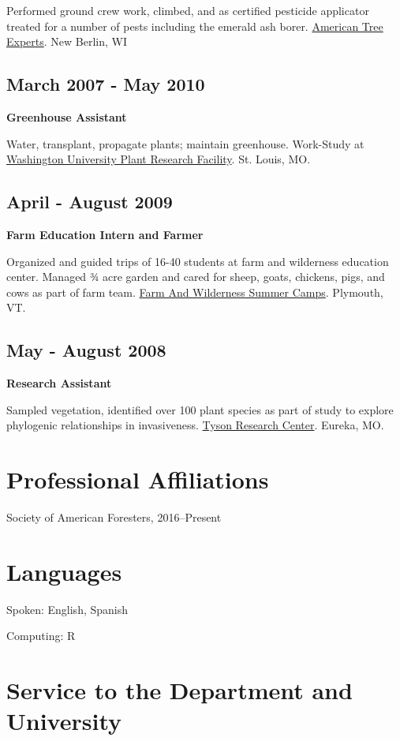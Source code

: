 \documentclass[11pt, sans]{moderncv}
\begin{document}
Performed ground crew work, climbed, and as certified pesticide
applicator treated for a number of pests including the emerald ash
borer. \href{http://atetreecare.com/}{American Tree Experts}.  New Berlin, WI

\subsection*{March 2007 - May 2010}
\label{sec:org07abbd5}
\textbf{Greenhouse Assistant}

Water, transplant, propagate plants; maintain greenhouse. Work-Study
at \href{http://biology4.wustl.edu/greenhouse/index.html}{Washington University Plant Research Facility}. St. Louis, MO.

\subsection*{April - August 2009}
\label{sec:orgff1e200}
\textbf{Farm Education Intern and Farmer}

Organized and guided trips of 16-40 students at farm and wilderness
education center. Managed 3⁄4 acre garden and cared for sheep, goats,
chickens, pigs, and cows as part of farm team.  \href{https://farmandwilderness.org/}{Farm And Wilderness
Summer Camps}. Plymouth, VT.

\subsection*{May - August 2008}
\label{sec:org016186d}
\textbf{Research Assistant}

Sampled vegetation, identified over 100 plant species as part of study
to explore phylogenic relationships in invasiveness.  \href{https://tyson.wustl.edu/2008}{Tyson Research
Center}. Eureka, MO.
\section*{Professional Affiliations}
\label{sec:orga776f93}
Society of American Foresters, 2016--Present

\section*{Languages}
\label{sec:org67e6d84}
Spoken: English, Spanish

Computing: R

\section*{Service to the Department and University}
\label{sec:orgeb2f6ad}
\end{document}
